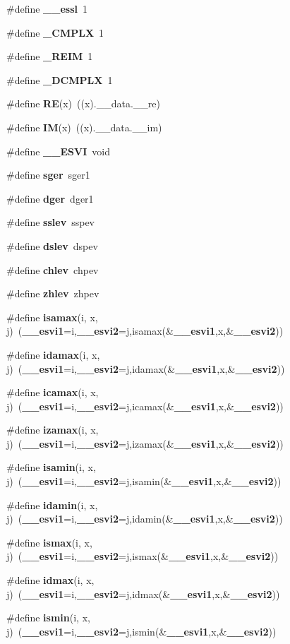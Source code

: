 \begin{CompactItemize}
\item 
\#define {\bf \_\-\_\-essl}~1
\item 
\#define {\bf \_\-CMPLX}~1
\item 
\#define {\bf \_\-REIM}~1
\item 
\#define {\bf \_\-DCMPLX}~1
\item 
\#define {\bf RE}(x)~((x).\_\-\_\-data.\_\-\_\-re)
\item 
\#define {\bf IM}(x)~((x).\_\-\_\-data.\_\-\_\-im)
\item 
\#define {\bf \_\-\_\-ESVI}~void
\item 
\#define {\bf sger}~sger1
\item 
\#define {\bf dger}~dger1
\item 
\#define {\bf sslev}~sspev
\item 
\#define {\bf dslev}~dspev
\item 
\#define {\bf chlev}~chpev
\item 
\#define {\bf zhlev}~zhpev
\item 
\#define {\bf isamax}(i, x, j)~({\bf \_\-\_\-esvi1}=i,{\bf \_\-\_\-esvi2}=j,isamax(\&{\bf \_\-\_\-esvi1},x,\&{\bf \_\-\_\-esvi2}))
\item 
\#define {\bf idamax}(i, x, j)~({\bf \_\-\_\-esvi1}=i,{\bf \_\-\_\-esvi2}=j,idamax(\&{\bf \_\-\_\-esvi1},x,\&{\bf \_\-\_\-esvi2}))
\item 
\#define {\bf icamax}(i, x, j)~({\bf \_\-\_\-esvi1}=i,{\bf \_\-\_\-esvi2}=j,icamax(\&{\bf \_\-\_\-esvi1},x,\&{\bf \_\-\_\-esvi2}))
\item 
\#define {\bf izamax}(i, x, j)~({\bf \_\-\_\-esvi1}=i,{\bf \_\-\_\-esvi2}=j,izamax(\&{\bf \_\-\_\-esvi1},x,\&{\bf \_\-\_\-esvi2}))
\item 
\#define {\bf isamin}(i, x, j)~({\bf \_\-\_\-esvi1}=i,{\bf \_\-\_\-esvi2}=j,isamin(\&{\bf \_\-\_\-esvi1},x,\&{\bf \_\-\_\-esvi2}))
\item 
\#define {\bf idamin}(i, x, j)~({\bf \_\-\_\-esvi1}=i,{\bf \_\-\_\-esvi2}=j,idamin(\&{\bf \_\-\_\-esvi1},x,\&{\bf \_\-\_\-esvi2}))
\item 
\#define {\bf ismax}(i, x, j)~({\bf \_\-\_\-esvi1}=i,{\bf \_\-\_\-esvi2}=j,ismax(\&{\bf \_\-\_\-esvi1},x,\&{\bf \_\-\_\-esvi2}))
\item 
\#define {\bf idmax}(i, x, j)~({\bf \_\-\_\-esvi1}=i,{\bf \_\-\_\-esvi2}=j,idmax(\&{\bf \_\-\_\-esvi1},x,\&{\bf \_\-\_\-esvi2}))
\item 
\#define {\bf ismin}(i, x, j)~({\bf \_\-\_\-esvi1}=i,{\bf \_\-\_\-esvi2}=j,ismin(\&{\bf \_\-\_\-esvi1},x,\&{\bf \_\-\_\-esvi2}))

\end{CompactItemize}
